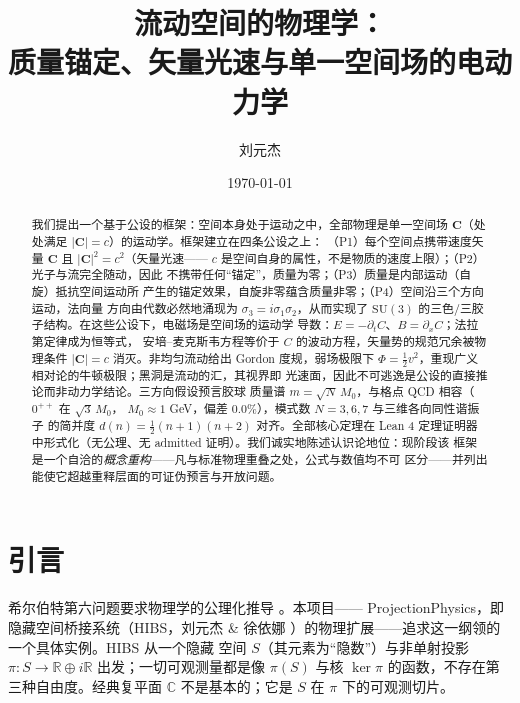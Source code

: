 \documentclass[aps,prd,preprint,superscriptaddress,amsmath,amssymb]{revtex4-2}
\begin{document}
\title{流动空间的物理学：\\ 质量锚定、矢量光速与单一空间场的电动力学}

\author{刘元杰}

\date{\today}

\begin{abstract}
我们提出一个基于公设的框架：空间本身处于运动之中，全部物理是单一空间场
$\bm{C}$（处处满足 $|\bm{C}|=c$）的运动学。框架建立在四条公设之上：
（P1）每个空间点携带速度矢量 $\bm{C}$ 且 $|\bm{C}|^2=c^2$（矢量光速——
$c$ 是空间自身的属性，不是物质的速度上限）；（P2）光子与流完全随动，因此
不携带任何``锚定''，质量为零；（P3）质量是内部运动（自旋）抵抗空间运动所
产生的锚定效果，自旋非零蕴含质量非零；（P4）空间沿三个方向运动，法向量
方向由代数必然地涌现为 $\sigma_3=i\sigma_1\sigma_2$，从而实现了
$\mathrm{SU}(3)$ 的三色/三胶子结构。在这些公设下，电磁场是空间场的运动学
导数：$E=-\partial_t C$、$B=\partial_x C$；法拉第定律成为恒等式，
安培--麦克斯韦方程等价于 $C$ 的波动方程，矢量势的规范冗余被物理条件
$|\bm{C}|=c$ 消灭。非均匀流动给出 Gordon 度规，弱场极限下
$\Phi=\frac12 v^2$，重现广义相对论的牛顿极限；黑洞是流动的汇，其视界即
光速面，因此不可逃逸是公设的直接推论而非动力学结论。三方向假设预言胶球
质量谱 $m=\sqrt{N}\,M_0$，与格点 QCD 相容（$0^{++}$ 在 $\sqrt3\,M_0$，
$M_0\approx1$ GeV，偏差 $0.0\%$），模式数 $N=3,6,7$ 与三维各向同性谐振子
的简并度 $d(n)=\frac12(n+1)(n+2)$ 对齐。全部核心定理在 Lean 4 定理证明器
中形式化（无公理、无 admitted 证明）。我们诚实地陈述认识论地位：现阶段该
框架是一个自洽的\emph{概念重构}——凡与标准物理重叠之处，公式与数值均不可
区分——并列出能使它超越重释层面的可证伪预言与开放问题。
\end{abstract}


\maketitle

\section{引言}\label{sec:intro}

希尔伯特第六问题要求物理学的公理化推导 \cite{Hilbert1900}。本项目——
ProjectionPhysics，即隐藏空间桥接系统（HIBS，刘元杰 \& 徐依娜
\cite{LiuXu}）的物理扩展——追求这一纲领的一个具体实例。HIBS 从一个隐藏
空间 $S$（其元素为``隐数''）与非单射投影
$\pi:S\to \mathbb{R}\oplus i\mathbb{R}$ 出发；一切可观测量都是像
$\pi(S)$ 与核 $\ker\pi$ 的函数，不存在第三种自由度。经典复平面
$\mathbb{C}$ 不是基本的；它是 $S$ 在 $\pi$ 下的可观测切片。
\end{document}
